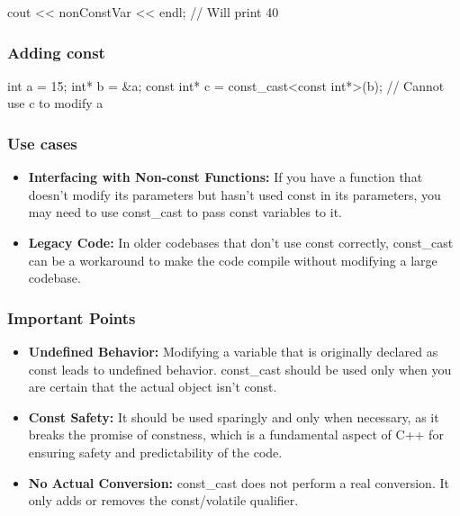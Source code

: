 \documentclass{report}
\begin{document}
\begin{concept}
\begin{cppcode}
    cout << nonConstVar << endl; // Will print 40
    \end{cppcode}

    \bigbreak \noindent 
    \subsubsection{Adding const}
    \bigbreak \noindent 
    \begin{cppcode}
    int a = 15;
    int* b = &a;
    const int* c = const_cast<const int*>(b); // Cannot use c to modify a
    \end{cppcode}
    \bigbreak \noindent 

    \bigbreak \noindent 
    \subsubsection{Use cases}
    \begin{itemize}
        \item \textbf{Interfacing with Non-const Functions:} If you have a function that doesn't modify its parameters but hasn't used const in its parameters, you may need to use const\_cast to pass const variables to it.
       \item \textbf{Legacy Code:} In older codebases that don't use const correctly, const\_cast can be a workaround to make the code compile without modifying a large codebase.
    \end{itemize}

    \bigbreak \noindent 
    \subsubsection{Important Points}
    \begin{itemize}
        \item \textbf{Undefined Behavior:} Modifying a variable that is originally declared as const leads to undefined behavior. const\_cast should be used only when you are certain that the actual object isn't const.
        \item \textbf{Const Safety:} It should be used sparingly and only when necessary, as it breaks the promise of constness, which is a fundamental aspect of C++ for ensuring safety and predictability of the code.
        \item \textbf{No Actual Conversion:} const\_cast does not perform a real conversion. It only adds or removes the const/volatile qualifier.
    \end{itemize}


\end{concept}
\end{document}
